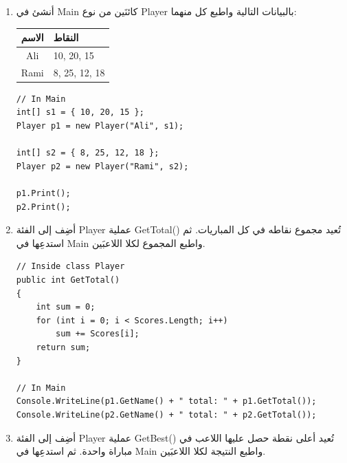 \documentclass[14pt]{extarticle}
\begin{document}
\begin{enumerate}

\item
أنشئ في \textenglish{Main} كائنَين من نوع \textenglish{Player} بالبيانات التالية
واطبع كل منهما:

\begin{center}
\begin{tabular}{|c|l|}
\hline
\textbf{الاسم} & \textbf{النقاط} \\
\hline
\textenglish{Ali}  & \textenglish{10, 20, 15} \\
\textenglish{Rami} & \textenglish{8, 25, 12, 18} \\
\hline
\end{tabular}
\end{center}

\ifwithsols
\begin{boxSolution}
\begin{english}
{\small
\begin{verbatim}
// In Main
int[] s1 = { 10, 20, 15 };
Player p1 = new Player("Ali", s1);

int[] s2 = { 8, 25, 12, 18 };
Player p2 = new Player("Rami", s2);

p1.Print();
p2.Print();
\end{verbatim}
}
\end{english}
\end{boxSolution}
\clearpage
\fi

\item
أضِف إلى الفئة \textenglish{Player} عملية \textenglish{GetTotal()} تُعيد مجموع نقاطه
في كل المباريات.
ثم استدعِها في \textenglish{Main} واطبع المجموع لكلا اللاعبَين.

\ifwithsols
\begin{boxSolution}
\begin{english}
{\small
\begin{verbatim}
// Inside class Player
public int GetTotal()
{
    int sum = 0;
    for (int i = 0; i < Scores.Length; i++)
        sum += Scores[i];
    return sum;
}

// In Main
Console.WriteLine(p1.GetName() + " total: " + p1.GetTotal());
Console.WriteLine(p2.GetName() + " total: " + p2.GetTotal());
\end{verbatim}
}
\end{english}
\end{boxSolution}
\clearpage
\fi

\item
أضِف إلى الفئة \textenglish{Player} عملية \textenglish{GetBest()} تُعيد أعلى نقطة
حصل عليها اللاعب في مباراة واحدة.
ثم استدعِها في \textenglish{Main} واطبع النتيجة لكلا اللاعبَين.


\end{enumerate}
\end{document}
